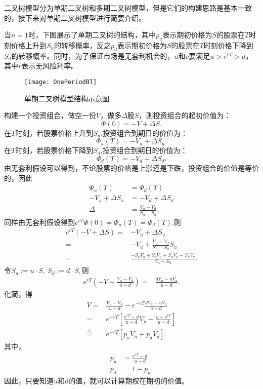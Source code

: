 二叉树模型分为单期二叉树和多期二叉树模型，但是它们的构建思路是基本一致的，接下来对单期二叉树模型进行简要介绍。

当$n=1$时，下图展示了单期二叉树的结构，其中$p_u$表示期初价格为$S$的股票在$T$时刻价格上升到$S_u$的转移概率，反之$p_d$表示期初价格为$S$的股票在$T$时刻价格下降到$S_d$的转移概率。同时，为了保证市场是无套利机会的，$u$和$v$要满足$u>e^{rT}>d$，其中$r$表示无风险利率。
\begin{figure}[H]
	\centering
	\texttt{[image: OnePeriodBT]}
	\caption{单期二叉树模型结构示意图}
\end{figure}

构建一个投资组合，做空一份$V$，做多$\Delta$股$S$，则投资组合的起初价值为：
$$\Phi(0) = -V+\Delta S.$$
在$T$时刻，若股票价格上升到$S_u$,投资组合到期日的价值为：
$$\Phi_u(T)  = -V_u + \Delta S_u.$$
在$T$时刻，若股票价格下降到$S_d$,投资组合到期日的价值为：
$$\Phi_d(T) = -V_d + \Delta S_d.$$
由无套利假设可以得到，不论股票的价格是上涨还是下跌，投资组合的价值是等价的，因此
\begin{align}
	\Phi_u(T) & = \Phi_d(T) \nonumber\\
	 -V_u + \Delta S_u &= -V_d + \Delta S_d \nonumber\\
	 \Delta &= \frac{V_u-V_d}{S_u-S_d}. \nonumber
\end{align}
同样由无套利假设得到$e^{rT}\Phi(0) = \Phi_u(T) = \Phi_d(T).$则
\begin{align}
	e^{rT}\left(-V+\Delta S\right) =& -V_u + \Delta S_u\nonumber\\
	=& -V_u + \frac{V_u-V_d}{S_u-S_d}S_u \nonumber\\
	=& \frac{-S_uV_u+S_dV_u+S_uV_u-S_uV_d}{S_u-S_d}. \nonumber
\end{align}
令$S_u := u\cdot S,\ S_d:=d\cdot S,$则
\begin{align}
	e^{rT}\left(-V+\frac{V_u-V_d}{u-d}\right) =& \frac{dV_u-uV_d}{u-d}.\nonumber
\end{align}
化简，得
\begin{align}
	V =& \frac{V_u-V_d}{u-d} -  e^{-rT}\frac{dV_u-uV_d}{u-d} \nonumber\\
	=& e^{-rT}\left[ \frac{e^{rT}-d}{u-d}V_u+\frac{u-e^{rT}}{u-d}\right] \nonumber \\
	\stackrel{\triangle}{=}& e^{-rT}\left[p_u V_u + p_dV_d \right] .\nonumber
\end{align}
其中，
\begin{align}
p_u &= \frac{e^{rT}-d}{u-d} \nonumber\\
p_d &=1-p_u.\nonumber
\end{align}
因此，只要知道$u$和$d$的值，就可以计算期权在期初的价值。

